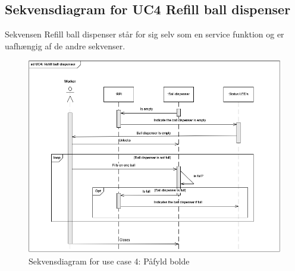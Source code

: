 \documentclass[Arkitektur/System_main.tex]{subfiles}
\begin{document}
\subsection{Sekvensdiagram for UC4 Refill ball dispenser}
Sekvensen Refill ball dispenser står for sig selv som en service funktion og er uafhængig af de andre sekvenser. 
\begin{figure}[H]
    \centering
    \includegraphics[scale=0.9]{Arkitektur/Sekvensdiagrammer/graphics/sd_UC4.png}
    \caption{Sekvensdiagram for use case 4: Påfyld bolde}
    \label{fig:sd_UC4}
\end{figure}
\end{document}
